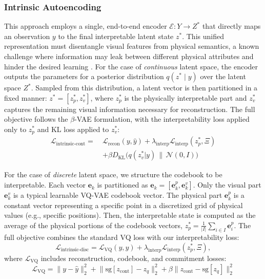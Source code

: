 \documentclass[nonacm,sigconf]{acmart}
\begin{document}
\subsubsection{Intrinsic Autoencoding}

This approach employs a single, end-to-end encoder \(\mathcal{E}: Y \to Z^*\) that directly maps an observation \(y\) to the final interpretable latent state \(z^*\). This unified representation must disentangle visual features from physical semantics, a known challenge where information may leak between different physical attributes and hinder the desired learning \cite[]{peper2025four}.
For the case of \textit{continuous} latent space, the encoder outputs the parameters for a posterior distribution \(q(z^*\mid y)\) over the latent space \(Z^*\). Sampled from this distribution, a latent vector is then partitioned in a fixed manner:  \(z^* = [z_p^*, z_v^*]\), where \(z_p^*\) is the physically interpretable part and \(z_v^*\) captures the remaining visual information necessary for reconstruction. The full objective follows the \(\beta\)-VAE formulation, with the interpretability loss applied only to \(z_p^*\) and KL loss applied to $z_v^*$:
\begin{equation}
\begin{split}
    \mathcal{L}_{\text{intrinsic-cont}} = ~&\mathcal{L}_{\text{recon}}(y, \hat{y}) + \lambda_{\text{interp}}\mathcal{L}_{\text{interp}}(z_p^*, \Xi) \\
    &+ \beta D_{\text{KL}}\big(q(z_v^*|y) \,\|\, \mathcal{N}(0, I)\big)
\end{split}
\end{equation}


For the case of \textit{discrete} latent space, we structure the codebook to be interpretable. Each vector \(\mathbf{e}_k\) is partitioned as \(\mathbf{e}_k = [\mathbf{e}_k^p, \mathbf{e}_k^v]\).  Only the visual part \(\mathbf{e}_k^v\) is a typical learnable VQ-VAE codebook vector.  The physical part \(\mathbf{e}_k^p\) is a constant vector representing a specific point in a discretized grid of physical values (e.g., specific positions). Then, the interpretable state is computed as the average of the physical portions of the codebook vectors, \( z_p^* = \frac{1}{|I|} \sum_{i \in I} \mathbf{e}_i^p \). The full objective combines the standard VQ loss with our interpretability loss:
\begin{equation}
    \mathcal{L}_{\text{intrinsic-disc}} = \mathcal{L}_{\text{VQ}}(y, \hat{y}) + \lambda_{\text{interp}}\mathcal{L}_{\text{interp}}(z_p^*, \Xi),
\end{equation}
where \(\mathcal{L}_{\text{VQ}}\) includes reconstruction, codebook, and commitment losses:
\begin{equation}
    \mathcal{L}_{\text{VQ}} = \big\| y - \hat{y} \big\|_2^2 + \big\| \text{sg}[z_{\text{cont}}] - z_q \big\|_2^2 + \beta \big\| z_{\text{cont}} - \text{sg}[z_q] \big\|_2^2
\end{equation}
\end{document}
